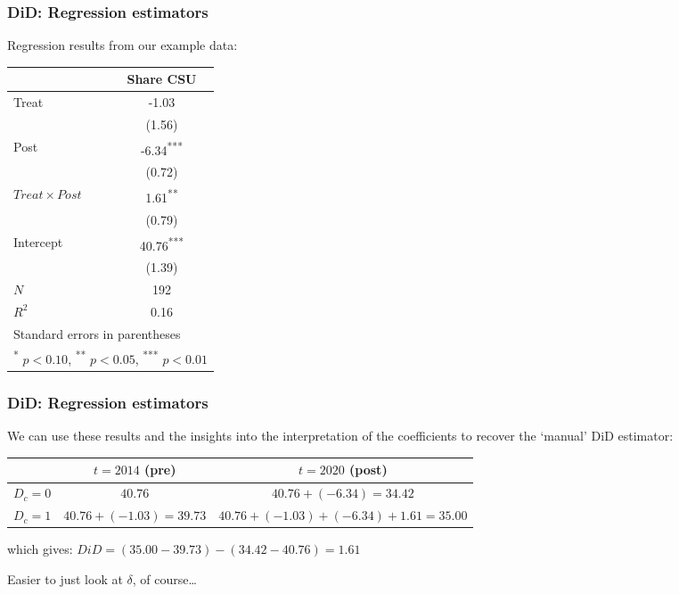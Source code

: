 \documentclass[12pt,english,dvipsnames,aspectratio=169,handout]{beamer}\usepackage[]{graphicx}\usepackage[]{xcolor}
\begin{document}
\begin{frame}
  \frametitle{DiD: Regression estimators}
\footnotesize

Regression results from our example data:

\scriptsize
\centering
\begin{tabular}{l*{1}{c}}
\toprule
          &\multicolumn{1}{c}{Share CSU}\\
\midrule
Treat     &    -1.03         \\
          &   (1.56)         \\
Post      &    -6.34\textsuperscript{***}\\
          &   (0.72)         \\
$Treat\times Post$&     1.61\textsuperscript{**} \\
          &   (0.79)         \\
Intercept    &    40.76\textsuperscript{***}\\
          &   (1.39)         \\
\midrule
\(N\)     &      192         \\
\(R^{2}\) &     0.16         \\
\bottomrule
\multicolumn{2}{l}{Standard errors in parentheses}\\
\multicolumn{2}{l}{ \textsuperscript{*} \(p<0.10\), \textsuperscript{**} \(p<0.05\), \textsuperscript{***} \(p<0.01\)}\\
\end{tabular}
\end{frame}




\begin{frame}
  \frametitle{DiD: Regression estimators}
\footnotesize

We can use these results and the insights into the interpretation of the coefficients to recover the `manual' DiD estimator:

\scriptsize
\begin{table}\centering
\begin{tabular}{lcc}
\toprule
            &   $t=2014$ (pre)      & $t=2020$ (post) \\
\midrule
$D_c=0$      & $40.76$            & $40.76 + (-6.34) = 34.42$ \\
$D_c=1$    & $40.76 + (-1.03) =39.73 $ & $40.76 + (-1.03) + (-6.34) + 1.61 = 35.00$ \\
\bottomrule
\end{tabular}
\end{table}

\footnotesize
which gives: $DiD = (35.00-39.73) - (34.42-40.76) = 1.61$

Easier to just look at $\delta$, of course\ldots

\end{frame}
\end{document}
